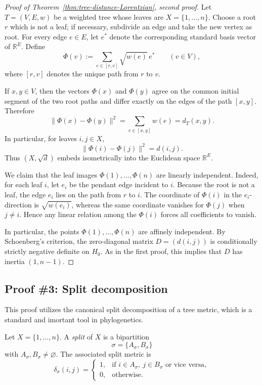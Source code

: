 \documentclass[12pt]{amsart}
\theoremstyle{definition}
\newcommand{\1}{\mathbf{1}}
\newcommand\R{{\mathbb R}}
\begin{document}
\begin{proof}[Proof of Theorem~\ref{thm:tree-distance-Lorentzian}, second proof]
Let $T=(V,E,w)$ be a weighted tree whose leaves are $X=\{1,\dots,n\}$.  Choose a
root $r$ which is not a leaf; if necessary, subdivide an edge and take the new vertex as
root.  For every edge $e\in E$, let $e^\ast$ denote the corresponding standard basis
vector of $\R^E$.  Define
\[
\Phi(v):=\sum_{e\in [r,v]} \sqrt{w(e)}\,e^\ast
\qquad (v\in V),
\]
where $[r,v]$ denotes the unique path from $r$ to $v$.

If $x,y\in V$, then the vectors $\Phi(x)$ and $\Phi(y)$ agree on the common initial
segment of the two root paths and differ exactly on the edges of the path $[x,y]$.
Therefore
\[
\|\Phi(x)-\Phi(y)\|^2
=
\sum_{e\in [x,y]} w(e)
=
d_T(x,y).
\]
In particular, for leaves $i,j\in X$,
\[
\|\Phi(i)-\Phi(j)\|^2=d(i,j).
\]
Thus $(X,\sqrt d)$ embeds isometrically into the Euclidean space $\R^E$.

We claim that the leaf images $\Phi(1),\dots,\Phi(n)$ are linearly independent.
Indeed, for each leaf $i$, let $e_i$ be the pendant edge incident to $i$.  Because the
root is not a leaf, the edge $e_i$ lies on the path from $r$ to $i$.  The coordinate of
$\Phi(i)$ in the $e_i$-direction is $\sqrt{w(e_i)}$, whereas the same coordinate
vanishes for $\Phi(j)$ when $j\neq i$.  Hence any linear relation among the
$\Phi(i)$ forces all coefficients to vanish.

In particular, the points $\Phi(1),\dots,\Phi(n)$ are affinely independent.  By
Schoenberg's criterion, the zero-diagonal matrix $D=(d(i,j))$ is
conditionally strictly negative definite on $H_0$.  As in the first proof, this implies
that $D$ has inertia $(1,n-1)$.
\end{proof}

\subsection{Proof \#3: Split decomposition}
\label{app:split-proof}

This proof utilizes the canonical split decomposition of a tree metric, which is a standard and imortant tool in phylogenetics.

Let $X=\{1,\dots,n\}$.  A \emph{split} of $X$ is a bipartition
\[
\sigma=\{A_\sigma,B_\sigma\}
\]
with $A_\sigma,B_\sigma\neq\varnothing$.  The associated split metric is
\[
\delta_\sigma(i,j)
=
\begin{cases}
1, & \text{if } i\in A_\sigma,\ j\in B_\sigma \text{ or vice versa},\\
0, & \text{otherwise}.
\end{cases}
\]
\end{document}
